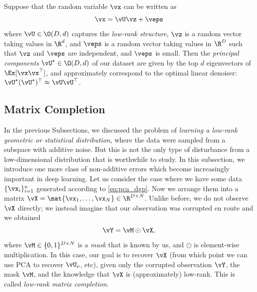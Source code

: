 \documentclass[../../book-main.tex]{subfiles}
\begin{document}
\begin{theorem}\label{thm:ppca}
    Suppose that the random variable \(\vx\) can be written as
    \begin{equation}
        \vx = \vU\vz + \veps
    \end{equation}
    where \(\vU \in \O(D, d)\) captures the \textit{low-rank structure}, \(\vz\)
    is a random vector taking values in \(\R^{d}\), and \(\veps\) is a random
    vector taking values in \(\R^{D}\) such that \(\vz\) and \(\veps\) are
    independent, and \(\veps\) is small. Then the \textit{principal components}
    \(\vU^{\star} \in \O(D, d)\) of our dataset are given by the top \(d\)
    eigenvectors of \(\Ex[\vx\vx^{\top}]\), and approximately correspond to the
    optimal linear denoiser: \(\vU^{\star}(\vU^{\star})^{\top} \approx \vU\vU^{\top}\).
\end{theorem}



\subsection{Matrix Completion}

In the previous Subsections, we discussed the problem of \textit{learning a low-rank geometric or statistical distribution}, where the data were sampled from a subspace with additive noise. But this is not the only type of disturbance from a low-dimensional distribution that is worthwhile to study. In this subsection, we introduce one more class of non-additive errors which become increasingly important in deep learning. Let us consider the case where we have some data \(\{\vx_{i}\}_{i = 1}^{n}\) generated according to \eqref{eq:pca_dgp}. Now we arrange them into a matrix \(\vX = \mat{\vx_{1}, \dots, \vx_{N}} \in \R^{D \times N}\). Unlike before, we do not observe \(\vX\) directly; we instead imagine that our observation was corrupted en route and we obtained 
\begin{equation}
    \vY = \vM \odot \vX,
\end{equation}
where \(\vM \in \{0, 1\}^{D \times N}\) is a \textit{mask} that is known by us, and \(\odot\) is element-wise multiplication. In this case, our goal is to recover \(\vX\) (from which point we can use PCA to recover \(\vU_{o}\), etc), given only the corrupted observation \(\vY\), the mask \(\vM\), and the knowledge that \(\vX\) is (approximately) low-rank. This is called \textit{low-rank matrix completion}.
\end{document}
